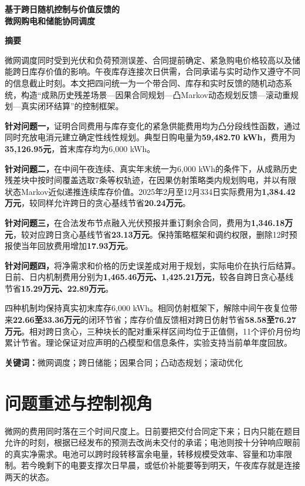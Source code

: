 \documentclass[UTF8,a4paper,zihao=-4,fontset=mac]{ctexart}
\begin{document}
\pagestyle{plain}
\thispagestyle{plain}
\begin{center}
{\LARGE\bfseries 基于跨日随机控制与价值反馈的\\微网购电和储能协同调度}\par\vspace{1em}
{\large\bfseries 摘\quad 要}
\end{center}
微网调度同时受到光伏和负荷预测误差、合同提前确定、紧急购电价格较高以及储能跨日库存价值的影响。午夜库存连接次日供需，合同承诺与实时动作又遵守不同的信息截止时刻。本文把四问统一为一个带合同、库存和实时反馈的随机动态系统，构造“成熟历史残差场景—因果合同规划—凸Markov动态规划反馈—滚动重规划—真实闭环结算”的控制框架。

\textbf{针对问题一，}证明合同费用与库存变化的紧急供能费用均为凸分段线性函数，通过同时充放电消元建立确定性线性规划。典型日购电量为\textbf{59,482.70 kWh}，费用为\textbf{35,126.95元}，首末库存均为6,000 kWh。

\textbf{针对问题二，}在中间午夜连续、真实年末统一为6,000 kWh的条件下，从成熟历史残差块中按时间覆盖选取7条等权轨迹，在因果仿射策略类内规划购电，并以有限状态Markov近似递推连续库存价值。2025年2月至12月334日实际费用为\textbf{1,384.42万元}，较同样允许跨日的贪心基线节省\textbf{20.24万元}。

\textbf{针对问题三，}在合法发布节点融入光伏预报并重订剩余合同，费用为\textbf{1,346.18万元}，较对应跨日贪心基线节省\textbf{23.13万元}。保持策略框架和调约权限，删除12时预报使当年回放费用增加\textbf{17.93万元}。

\textbf{针对问题四，}将净需求和价格的历史误差成对用于规划，实际电价在执行后结算。日前、日内机制费用分别为\textbf{1,465.46万元、1,425.21万元}，较各自跨日贪心基线节省\textbf{15.29万元、22.89万元}。

四种机制均保持真实初末库存6,000 kWh。相同仿射框架下，解除中间午夜复位带来\textbf{22.66至33.36万元}的闭环节省；库存价值反馈相对跨日仿射节省\textbf{58.58至76.27万元}。相对跨日贪心，三种块长的配对重采样区间均位于正值侧，11个评价月份均累计节省。理论保证对应声明的凸模型和信息条件，实验支持当前单年度回放。

\noindent\textbf{关键词：}微网调度；跨日储能；因果合同；凸动态规划；滚动优化
\clearpage
\section{问题重述与控制视角}
微网的费用同时落在三个时间尺度上。日前要把交付合同定下来；日内只能在题目允许的时刻，根据已经发布的预测去改尚未交付的承诺；电池则按十分钟响应眼前的真实净需求。电池可以跨时段转移富余电量，转移规模受效率、容量和功率限制。若今晚剩下的电要支撑次日早晨，或低价补能要等到明天，午夜库存就是连接两天的状态。
\end{document}

